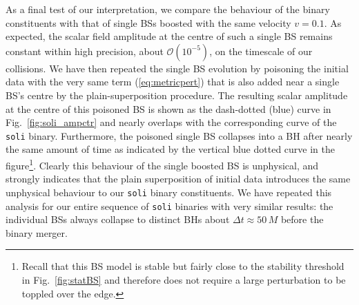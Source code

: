 \documentclass[]{iopart}
\newcommand{\us}[1]{\textcolor{teal}{[{\it\textbf{US: #1}}]} }
\renewcommand{\mr}[1]{\textcolor{purple}{[{\it\textbf{MR: #1}}]} }
\begin{document}
As a final test of our interpretation, we compare the behaviour
of the binary constituents with that of single BSs boosted with the
same velocity $v=0.1$. As expected, the scalar field amplitude at
the centre of such a single BS remains constant within high precision,
about $\mathcal{O}(10^{-5})$, on the timescale of our collisions.
We have then repeated the single BS evolution by poisoning the initial
data with the very same term (\ref{eq:metricpert}) that is also
added near a single BS's centre by the plain-superposition procedure.
The resulting scalar amplitude at the centre of this poisoned
BS is shown as the dash-dotted (blue) curve in
Fig.~\ref{fig:soli_ampctr} and nearly overlaps with the corresponding
curve of the {\tt soli} binary. Furthermore, the poisoned single
BS collapses into a BH after nearly the same amount of time as indicated
\setcounter{footnote}{4}
by the vertical blue dotted curve in the figure\footnote{
Recall that this BS model is stable but fairly close
to the stability threshold in Fig.~\ref{fig:statBS}
and therefore does not require a large perturbation to be
toppled over the edge.}.
Clearly this
behaviour of the single boosted BS is unphysical, and strongly
indicates that the plain superposition of initial data introduces
the same unphysical behaviour to our {\tt soli} binary constituents.
We have repeated this analysis for our entire sequence of
{\tt soli} binaries with very similar results: the individual
BSs always collapse to distinct BHs about $\Delta t\approx 50\,M$
before the binary merger.
\end{document}
